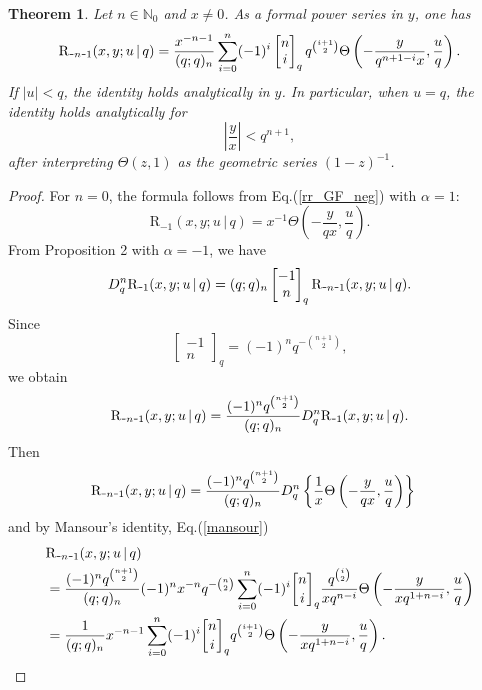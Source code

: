 \documentclass[12pt]{article}
\newcommand{\qbinom}{\genfrac{[}{]}{0pt}{}}
\newcommand{\minus}{\textup{\texttt{-}}}
\newcommand{\rr}{\mathrm{R}}
\newtheorem{theorem}{Theorem}
\begin{document}
\begin{theorem}\label{theo_rr_theta}
Let \(n\in\mathbb N_0\) and $x\neq0$. As a formal power series in \(y\), one has
\[
\rr_{\minus n\minus1}(x,y;u\,|\,q)
=
\frac{x^{-n-1}}{(q;q)_n}
\sum_{i=0}^{n}
(-1)^i
\begin{bmatrix}
n\\ i
\end{bmatrix}_q
q^{\binom{i+1}{2}}
\Theta\left(
-\frac{y}{q^{n+1-i}x},
\frac{u}{q}
\right).
\]
If \(|u|<q\), the identity holds analytically in \(y\). In particular, when \(u=q\), the identity holds analytically for 
\[ 
\left|\frac{y}{x}\right|<q^{n+1}, 
\] 
after interpreting \(\Theta(z,1)\) as the geometric series \((1-z)^{-1}\).
\end{theorem}
\begin{proof}
For \(n=0\), the formula follows from Eq.(\ref{rr_GF_neg}) with \(\alpha=1\):
\[
\rr_{-1}(x,y;u\,|\,q)
=
x^{-1}
\Theta\left(-\frac{y}{qx},\frac{u}{q}\right).
\]
From Proposition 2 with \(\alpha=-1\), we have
\[
D_q^n \rr_{\minus1}(x,y;u\,|\,q)
=
(q;q)_n
\begin{bmatrix}
-1\\ n
\end{bmatrix}_q
\rr_{\minus n\minus1}(x,y;u\,|\,q).
\]
Since
\[
\begin{bmatrix}
-1\\ n
\end{bmatrix}_q
=
(-1)^n q^{-\binom{n+1}{2}},
\]
we obtain
\[
\rr_{\minus n\minus1}(x,y;u\,|\,q)
=
\frac{(-1)^n q^{\binom{n+1}{2}}}{(q;q)_n}
D_q^n \rr_{\minus1}(x,y;u\,|\,q).
\]
Then
\begin{align*}
    \rr_{\minus n\minus1}(x,y;u\,|\,q)&=\frac{(-1)^{n}q^{\binom{n+1}{2}}}{(q;q)_{n}}D_{q}^n\left\{\frac{1}{x}\Theta\left(-\frac{y}{qx},\frac{u}{q}\right)\right\}
\end{align*}
and by Mansour's identity, Eq.(\ref{mansour})
\begin{align*}
    &\rr_{\minus n\minus1}(x,y;u\,|\,q)\\
    &=\frac{(-1)^{n}q^{\binom{n+1}{2}}}{(q;q)_{n}}(-1)^nx^{-n}q^{-\binom{n}{2}}\sum_{i=0}^{n}(-1)^i\qbinom{n}{i}_{q}\frac{q^{\binom{i}{2}}}{xq^{n-i}}\Theta\left(-\frac{y}{xq^{1+n-i}},\frac{u}{q}\right)\\
    &=\frac{1}{(q;q)_{n}}x^{-n-1}\sum_{i=0}^{n}(-1)^i\qbinom{n}{i}_{q}q^{\binom{i+1}{2}}\Theta\left(-\frac{y}{xq^{1+n-i}},\frac{u}{q}\right).
\end{align*}
\end{proof}
\end{document}
